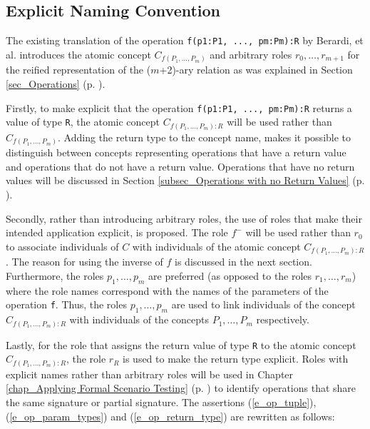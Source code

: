 \subsection{Explicit Naming Convention} \label{subsec_Meaningful Names}
The existing translation of the operation \texttt{f(p1:P1, ..., pm:Pm):R} by Berardi, et al. \cite{Berardi2005} introduces the atomic concept $C_{f(P_1, \ldots, P_m)}$ and arbitrary 
roles $r_0, \ldots, r_{m+1}$ for the reified representation of the ($m$+2)-ary relation as was explained in Section \ref{sec_Operations} (p. \pageref{sec_Operations}).


Firstly, to make explicit that the 
operation \texttt{f(p1:P1, ..., pm:Pm):R} returns a value of type \texttt{R}, the atomic concept $C_{f(P_1, \ldots, P_m):R}$ will be used rather than $C_{f(P_1, \ldots, P_m)}$.
Adding the return type to the concept name, makes it possible to distinguish between concepts representing operations that have a return value and operations that do
not have a return value. Operations that have no return values will be discussed in Section \ref{subsec_Operations with no Return Values} (p. \pageref{subsec_Operations with no Return Values}).

Secondly, rather than introducing arbitrary roles, the use of roles that make their intended application explicit, is proposed.
The role $f^-$ will be used rather than $r_0$ to associate individuals of $C$ with individuals of the atomic concept $C_{f(P_1, \ldots, P_m):R}$. 
The reason for using the inverse of $f$ is discussed in the next section.
Furthermore, the roles $p_1, \ldots, p_m$ are preferred (as opposed to the roles $r_1, \ldots, r_m$) where the role names correspond with the names of the parameters of the operation \texttt{f}.
Thus, the roles $p_1, \ldots, p_m$ are used to link individuals of the concept $C_{f(P_1, \ldots, P_m):R}$ with individuals of the concepts $P_1, \ldots, P_m$ respectively.

Lastly, for the role that assigns the return value of type \texttt{R} to the atomic concept $C_{f(P_1, \ldots, P_m):R}$, the role $r_R$ is used to make the return type explicit.
Roles with explicit names rather than arbitrary roles will be used in Chapter \ref{chap_Applying Formal Scenario Testing} (p. \pageref{chap_Applying Formal Scenario Testing}) to 
identify operations that share the same signature or partial signature. 
The assertions (\ref{e_op_tuple}), (\ref{e_op_param_types}) and (\ref{e_op_return_type}) are rewritten as follows:

